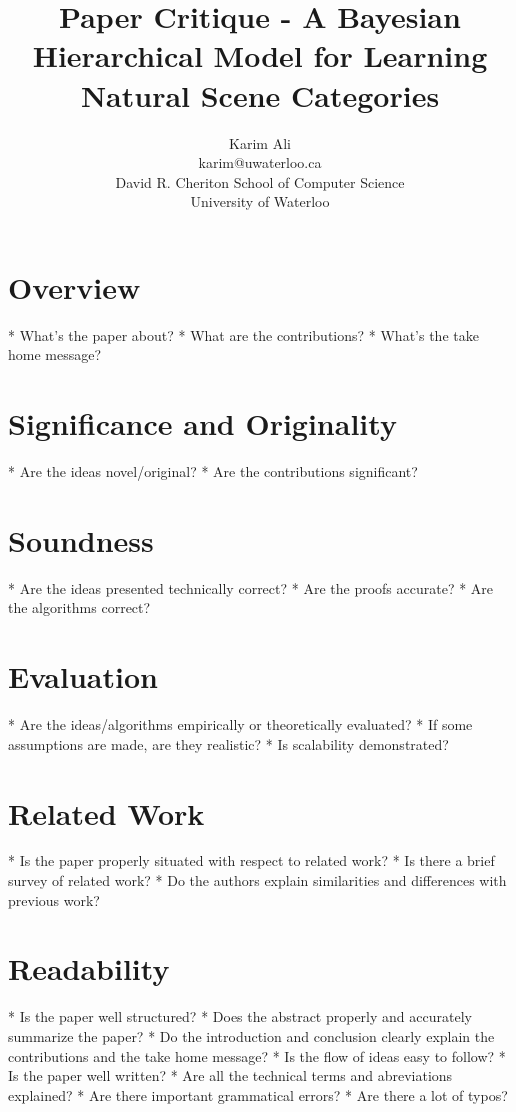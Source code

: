 \documentclass[12pt,a4paper]{article}
\begin{document}
\title{Paper Critique - A Bayesian Hierarchical Model for Learning Natural Scene Categories}


\author{Karim Ali\\
karim@uwaterloo.ca\\
David R. Cheriton School of Computer Science\\
University of Waterloo\\
}

\date{}

\maketitle

\section{Overview}

    * What's the paper about?
    * What are the contributions?
    * What's the take home message?

\section{Significance and Originality}

* Are the ideas novel/original?
* Are the contributions significant?

\section{Soundness}
* Are the ideas presented technically correct?
* Are the proofs accurate?
* Are the algorithms correct?

\section{Evaluation}
* Are the ideas/algorithms empirically or theoretically evaluated?
* If some assumptions are made, are they realistic?
* Is scalability demonstrated?

\section{Related Work}
* Is the paper properly situated with respect to related work?
* Is there a brief survey of related work?
* Do the authors explain similarities and differences with previous work?

\section{Readability}
* Is the paper well structured?
    * Does the abstract properly and accurately summarize the paper?
    * Do the introduction and conclusion clearly explain the contributions and the take home message?
    * Is the flow of ideas easy to follow?
* Is the paper well written?
    * Are all the technical terms and abreviations explained?
    * Are there important grammatical errors?
    * Are there a lot of typos?



\nocite{*}

\end{document}
